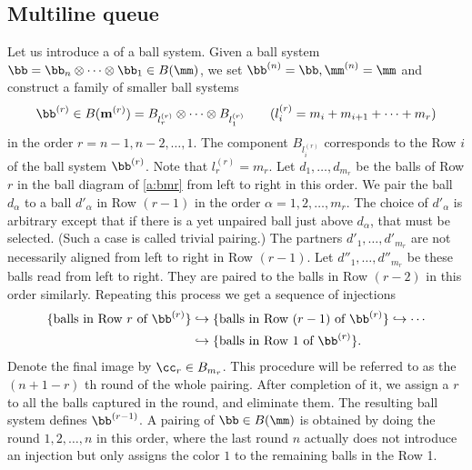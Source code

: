 \subsection{Multiline queue}\label{subsec:mq}
Let us introduce a  of a ball system.
Given a ball system
$\bb = \bb_n \otimes \cdots \otimes \bb_1 \in B(\mm)$,
we set $\bb^{(n)} = \bb, \mm^{(n)}= \mm$ and 
construct a family of smaller ball systems 
\begin{align}\label{a:bmr}
\bb^{(r)} \in B({\bf m}^{(r)}) = B_{l^{(r)}_r} \otimes  \cdots \otimes 
B_{l^{(r)}_1}\qquad  (l^{(r)}_i=m_i+m_{i+1}+\cdots + m_r)
\end{align}
 in the order $r=n-1, n-2,\ldots, 1$.
The component $B_{l^{(r)}_i}$ corresponds to the Row $i$ of the ball system $\bb^{(r)}$.
Note that $l^{(r)}_r=m_r$.
Let $d_1,\ldots, d_{m_r}$ be the balls of Row $r$ in the ball diagram of \eqref{a:bmr} from left to right in this order.
We pair the ball $d_\alpha$ to a ball $d'_\alpha$ in Row $(r-1)$ in the order $\alpha=1,2,\ldots, m_r$.
The choice of $d'_\alpha$ is arbitrary except that if there is a yet unpaired ball just above $d_\alpha$,
that must be selected.  (Such a case is called trivial pairing.)
The partners $d'_1,\ldots, d'_{m_r}$ are not necessarily aligned from left to right 
in Row $(r-1)$.
Let $d''_1,\ldots, d''_{m_r}$ be these balls read from left to right.
They are paired to the balls in Row $(r-2)$ in this order similarly.
Repeating this process we get a sequence of injections 
\begin{equation}
\label{a:cr}
\begin{aligned}
 \{ \text{balls in Row $r$ of $\bb^{(r)}$} \} &\hookrightarrow 
 \{ \text{balls in Row $(r-1)$ of $\bb^{(r)}$} \}
 \hookrightarrow \cdots \\ & \hookrightarrow 
 \{ \text{balls in Row $1$ of $\bb^{(r)}$} \}.
 \end{aligned}
\end{equation}
Denote the final image by $\cc_r \in B_{m_r}$.
This procedure will be referred to as the $(n+1-r)$ th round  of the whole pairing.
After completion of it, we assign a  $r$ to all the balls captured in the round, and 
eliminate them. The resulting ball system defines $\bb^{(r-1)}$.
A pairing of $\bb \in B(\mm)$ is obtained by doing the round  $1, 2, \ldots, n$ in this order,
where the  last round $n$ actually does not introduce an injection but only 
assigns the color $1$ to the remaining balls in the Row 1.

